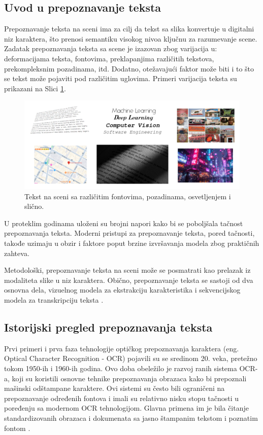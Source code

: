 \documentclass[a4paper,12pt]{article}
\begin{document}
	\subsection{Uvod u prepoznavanje teksta}
	Prepoznavanje teksta na sceni ima za cilj da tekst sa slika konvertuje u digitalni niz karaktera, što prenosi semantiku visokog nivoa ključnu za razumevanje scene. Zadatak prepoznavanja teksta sa scene je izazovan zbog varijacija u: deformacijama teksta, fontovima, preklapanjima različitih tekstova, prekompleksnim pozadinama, itd. Dodatno, otežavajući faktor može biti i to što se tekst može pojaviti pod različitim uglovima. Primeri varijacija teksta su prikazani na Slici \ref{fig:text-on-scene}.
	
	\begin{figure}[H]
		\centering
		\includegraphics[width=\textwidth]{assets/text-in-the-wild.png}
		\caption{Tekst na sceni sa različitim fontovima, pozadinama, osvetljenjem i slično.}
		\label{fig:text-on-scene}
	\end{figure}
	
	U proteklim godinama uloženi su brojni napori kako bi se poboljšala tačnost prepoznavanja teksta. Moderni pristupi za prepoznavanje teksta, pored tačnosti, takođe uzimaju u obzir i faktore poput brzine izvršavanja modela zbog praktičnih zahteva.
	
	Metodološki, prepoznavanje teksta na sceni može se posmatrati kao prelazak iz modaliteta slike u niz karaktera. Obično, prepoznavanje teksta se sastoji od dva osnovna dela, vizuelnog modela za ekstrakciju karakteristika i sekvencijskog modela za transkripciju teksta \cite{baidu2022dio}.
	\newpage
	
	\subsection{Istorijski pregled prepoznavanja teksta}
	
	Prvi primeri i prva faza tehnologije optičkog prepoznavanja karaktera (eng. Optical Character Recognition - OCR) pojavili su se sredinom 20. veka, pretežno tokom 1950-ih i 1960-ih godina. Ovo doba obeležilo je razvoj ranih sistema OCR-a, koji su koristili osnovne tehnike prepoznavanja obrazaca kako bi prepoznali mašinski odštampane karaktere. Ovi sistemi su često bili ograničeni na prepoznavanje određenih fontova i imali su relativno nisku stopu tačnosti u poređenju sa modernom OCR tehnologijom. Glavna primena im je bila čitanje standardizovanih obrazaca i dokumenata sa jasno štampanim tekstom i poznatim fontom \cite{briefHistoryOfOCR}.
	
\end{document}
